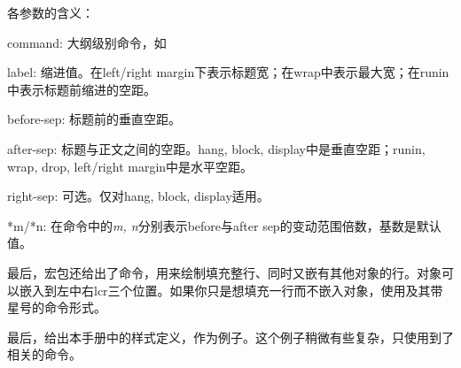 各参数的含义：
\begin{para}
\item[command:] 大纲级别命令，如
\item[label:] 缩进值。在left/right margin下表示标题宽；在wrap中表示最大宽；在runin中表示标题前缩进的空距。
\item[before-sep:] 标题前的垂直空距。
\item[after-sep:] 标题与正文之间的空距。hang, block, display中是垂直空距；runin, wrap, drop, left/right margin中是水平空距。
\item[right-sep:] 可选。仅对hang, block, display适用。
\item[*m/*n:] 在命令中的\textit{m, n}分别表示before与after sep的变动范围倍数，基数是默认值。
\end{para}

最后，宏包还给出了命令，用来绘制填充整行、同时又嵌有其他对象的行。对象可以嵌入到左中右lcr三个位置。如果你只是想填充一行而不嵌入对象，使用及其带星号的命令形式。
\begin{latex}
\end{latex}

最后，给出本手册中的样式定义，作为例子。这个例子稍微有些复杂，只使用到了相关的命令。

